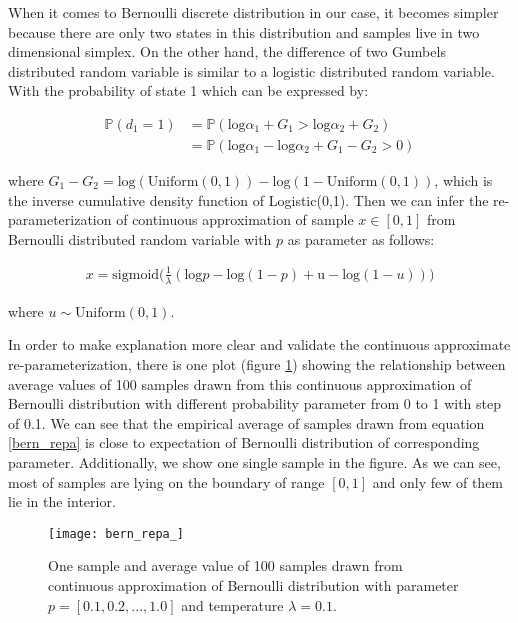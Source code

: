 When it comes to Bernoulli discrete distribution in our case, it becomes simpler because there are only two states in this distribution and samples live in two dimensional simplex. On the other hand, the difference of two Gumbels distributed random variable is similar to a logistic distributed random variable.  With the probability of state 1 which can be expressed by:

\[
\begin{aligned}
\mathbb P(d_1 = 1) &= \mathbb P(\text{log} \alpha_1 + G_1 >\text{log} \alpha_2 + G_2)\\
&=\mathbb P(\text{log} \alpha_1 - \text{log} \alpha_2 + G_1 - G_2 > 0)
\end{aligned}
\] 

where $G_1 - G_2 = \text{log}(\text{Uniform}(0,1)) - \text{log}(1-\text{Uniform}(0,1))$, which is the inverse cumulative density function of Logistic(0,1).
Then we can infer the re-parameterization of continuous approximation of sample $x \in [0, 1]$ from Bernoulli distributed random variable with $p$ as parameter as follows:

\begin{equation}\label{bern_repa}
	\begin{aligned}
	x = \text{sigmoid}\big(
	\frac{1}{\lambda} (\text{log}p - \text{log}(1-p) + \text{u} - \text{log}(1-u)) 
	\big)
	\end{aligned}
\end{equation}

where $u \sim \text{Uniform}(0,1)$. 

In order to make explanation more clear and validate the continuous approximate re-parameterization, there is one plot (figure \ref{fig:bern_repa}) showing the relationship between average values of 100 samples drawn from this continuous approximation of Bernoulli distribution with different probability parameter from 0 to 1 with step of 0.1. We can see that the empirical average of samples drawn from equation \ref{bern_repa} is close to expectation of Bernoulli distribution of corresponding parameter. Additionally, we show one single sample in the figure. As we can see, most of samples are lying on the boundary of range $[0,1]$ and only few of them lie in the interior.
\begin{figure}[h!]
	\begin{center}
		\texttt{[image: bern\_repa\_]}
		\caption{One sample and average value of 100 samples drawn from continuous approximation of Bernoulli distribution with parameter $p = [0.1, 0.2, ..., 1.0]$ and temperature $ \lambda =0.1$.}		
		\label{fig:bern_repa}
	\end{center}
\end{figure}

